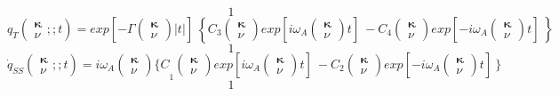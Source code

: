 \[1\] 
\[q_T\left( \begin{array}{c}
{\mathbf \kappa } \\ 
\nu  \end{array}
;;t\right)={exp \left[-\Gamma \left( \begin{array}{c}
{\mathbf \kappa } \\ 
\nu  \end{array}
\right)\left|t\right|\right]\ }\left\{C_3\left( \begin{array}{c}
{\mathbf \kappa } \\ 
\nu  \end{array}
\right){exp \left[i{\omega }_A\left( \begin{array}{c}
{\mathbf \kappa } \\ 
\nu  \end{array}
\right)t\right]\ }-C_4\left( \begin{array}{c}
{\mathbf \kappa } \\ 
\nu  \end{array}
\right){exp \left[-i{\omega }_A\left( \begin{array}{c}
{\mathbf \kappa } \\ 
\nu  \end{array}
\right)t\right]\ }\right\}\] 
\[1\] 
\[{\dot{q}}_{SS}\left( \begin{array}{c}
{\mathbf \kappa } \\ 
\nu  \end{array}
;;t\right)={i{\omega }_A\left( \begin{array}{c}
{\mathbf \kappa } \\ 
\nu  \end{array}
\right)\{C}_1\left( \begin{array}{c}
{\mathbf \kappa } \\ 
\nu  \end{array}
\right){exp \left[i{\omega }_A\left( \begin{array}{c}
{\mathbf \kappa } \\ 
\nu  \end{array}
\right)t\right]\ }-C_2\left( \begin{array}{c}
{\mathbf \kappa } \\ 
\nu  \end{array}
\right){exp \left[-i{\omega }_A\left( \begin{array}{c}
{\mathbf \kappa } \\ 
\nu  \end{array}
\right)t\right]\ }\}\] 
\[1\] 
